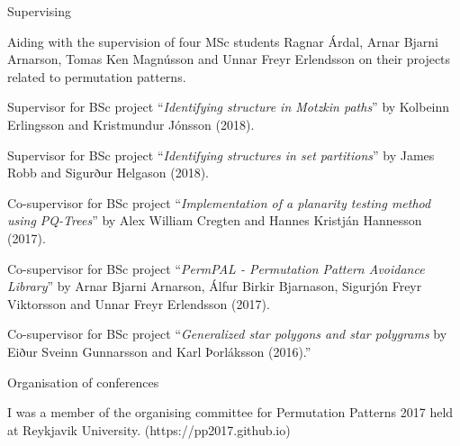 


\begin{cventries}


\cventry
{Supervising}
{}
{}
{}
{
\begin{cvitems} %
  \item {Aiding with the supervision of four MSc students Ragnar Árdal, Arnar Bjarni Arnarson, Tomas Ken Magnússon and Unnar Freyr Erlendsson on their projects related to permutation patterns.}
  \item {Supervisor for BSc project ``\textit{Identifying structure in Motzkin paths}'' by Kolbeinn Erlingsson and Kristmundur Jónsson (2018).}
  \item {Supervisor for BSc project ``\textit{Identifying structures in set partitions}'' by James Robb and Sigurður Helgason (2018).}
  \item {Co-supervisor for BSc project ``\textit{Implementation of a planarity testing method using PQ-Trees}'' by Alex William Cregten and Hannes Kristján Hannesson (2017).}
  \item {Co-supervisor for BSc project ``\textit{PermPAL - Permutation Pattern Avoidance Library}'' by Arnar Bjarni Arnarson, Álfur Birkir Bjarnason, Sigurjón Freyr Viktorsson and Unnar Freyr Erlendsson (2017).}
  \item {Co-supervisor for BSc project ``\textit{Generalized star polygons and star polygrams} by Eiður Sveinn Gunnarsson and Karl Þorláksson (2016).''}
\end{cvitems}
}


\cventry
{Organisation of conferences}
{}
{}
{}
{
\begin{cvitems} %
  \item {I was a member of the organising committee for Permutation Patterns 2017 held at Reykjavik University. (https://pp2017.github.io)}
\end{cvitems}
}


\end{cventries}
